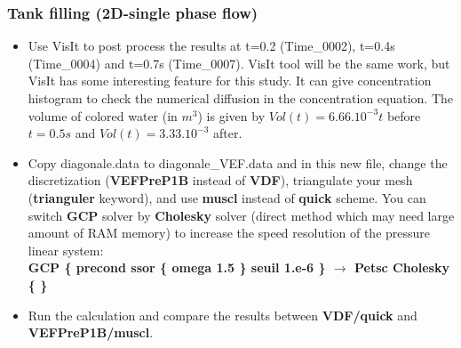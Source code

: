 \documentclass[10pt]{beamer}
\begin{document}
\begin{frame}
\frametitle{Tank filling (2D-single phase flow)}
\begin{block}{}

\begin{itemize}
\item Use VisIt to post process the results at t=0.2 (Time\_0002), t=0.4s (Time\_0004) and t=0.7s (Time\_0007). VisIt tool will be the same work, but VisIt has some interesting feature for this study. It can give concentration histogram to check the numerical diffusion in the concentration equation. The volume of colored water (in $m^3$) is given by $Vol(t)= 6.66.10^{-3} t$ before $t=0.5s$ and $Vol(t)=3.33.10^{-3}$ after.

\item Copy diagonale.data to diagonale\_VEF.data and in this new file, change the discretization (\textbf{VEFPreP1B} instead of \textbf{VDF}), triangulate your mesh (\textbf{trianguler} keyword), and use \textbf{muscl} instead of \textbf{quick} scheme. You can switch \textbf{GCP} solver by \textbf{Cholesky} solver (direct method which may need large amount of RAM memory) to increase the speed resolution of the pressure linear system:\\
\textbf{GCP \{ precond ssor \{ omega 1.5 \} seuil 1.e-6 \} $\rightarrow$ Petsc Cholesky \{ \}}

\item Run the calculation and compare the results between \textbf{VDF/quick} and \textbf{VEFPreP1B/muscl}.
\end{itemize}

\end{block}
\end{frame}
\end{document}
